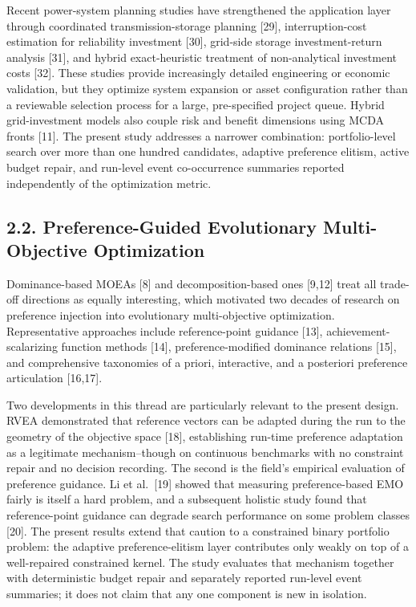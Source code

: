 \documentclass[
  10pt,
  a4paper,
]{article}
\begin{document}
Recent power-system planning studies have strengthened the application
layer through coordinated transmission-storage planning {[}29{]},
interruption-cost estimation for reliability investment {[}30{]},
grid-side storage investment-return analysis {[}31{]}, and hybrid
exact-heuristic treatment of non-analytical investment costs {[}32{]}.
These studies provide increasingly detailed engineering or economic
validation, but they optimize system expansion or asset configuration
rather than a reviewable selection process for a large, pre-specified
project queue. Hybrid grid-investment models also couple risk and
benefit dimensions using MCDA fronts {[}11{]}. The present study
addresses a narrower combination: portfolio-level search over more than
one hundred candidates, adaptive preference elitism, active budget
repair, and run-level event co-occurrence summaries reported
independently of the optimization metric.

\subsection{2.2. Preference-Guided Evolutionary Multi-Objective
Optimization}\label{preference-guided-evolutionary-multi-objective-optimization}

Dominance-based MOEAs {[}8{]} and decomposition-based ones {[}9,12{]}
treat all trade-off directions as equally interesting, which motivated
two decades of research on preference injection into evolutionary
multi-objective optimization. Representative approaches include
reference-point guidance {[}13{]}, achievement-scalarizing function
methods {[}14{]}, preference-modified dominance relations {[}15{]}, and
comprehensive taxonomies of a priori, interactive, and a posteriori
preference articulation {[}16,17{]}.

Two developments in this thread are particularly relevant to the present
design. RVEA demonstrated that reference vectors can be adapted during
the run to the geometry of the objective space {[}18{]}, establishing
run-time preference adaptation as a legitimate mechanism--though on
continuous benchmarks with no constraint repair and no decision
recording. The second is the field's empirical evaluation of preference
guidance. Li et al.~{[}19{]} showed that measuring preference-based EMO
fairly is itself a hard problem, and a subsequent holistic study found
that reference-point guidance can degrade search performance on some
problem classes {[}20{]}. The present results extend that caution to a
constrained binary portfolio problem: the adaptive preference-elitism
layer contributes only weakly on top of a well-repaired constrained
kernel. The study evaluates that mechanism together with deterministic
budget repair and separately reported run-level event summaries; it does
not claim that any one component is new in isolation.
\end{document}
